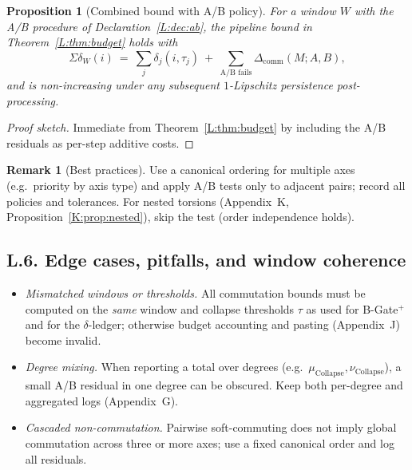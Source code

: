 \documentclass[11pt]{article}
\DeclareRobustCommand{\hyp}{\nobreakdash-}
\numberwithin{equation}{section}
\newtheorem{proposition}[theorem]{Proposition}
\theoremstyle{definition}
\newtheorem{remark}[theorem]{Remark}
\DeclareRobustCommand{\muc}{\mu_{\mathrm{Collapse}}}
\DeclareRobustCommand{\nuc}{\nu_{\mathrm{Collapse}}}
\begin{document}
\begin{proposition}[Combined bound with A/B policy]\label{L:prop:combined}
For a window \(W\) with the A/B procedure of Declaration~\ref{L:dec:ab}, the pipeline bound in Theorem~\ref{L:thm:budget} holds with
\[
\Sigma\delta_W(i)\ =\ \sum_{j}\delta_j(i,\tau_j)\ +\ \sum_{\text{A/B fails}} \Delta_{\mathrm{comm}}(M;A,B),
\]
and is non\hyp increasing under any subsequent \(1\)\hyp Lipschitz persistence post\hyp processing.
\end{proposition}

\begin{proof}[Proof sketch]
Immediate from Theorem~\ref{L:thm:budget} by including the A/B residuals as per\hyp step additive costs.
\end{proof}

\begin{remark}[Best practices]
Use a canonical ordering for multiple axes (e.g.\ priority by axis type) and apply A/B tests only to adjacent pairs; record all policies and tolerances. For nested torsions (Appendix~K, Proposition~\ref{K:prop:nested}), skip the test (order independence holds).
\end{remark}

\subsection*{L.6. Edge cases, pitfalls, and window coherence}
\begin{itemize}\itemsep0.25em
  \item \emph{Mismatched windows or thresholds.} All commutation bounds must be computed on the \emph{same} window and collapse thresholds \(\tau\) as used for B-Gate\(^{+}\) and for the \(\delta\)\hyp ledger; otherwise budget accounting and pasting (Appendix~J) become invalid.
  \item \emph{Degree mixing.} When reporting a total over degrees (e.g.\ \(\muc,\nuc\)), a small A/B residual in one degree can be obscured. Keep both per\hyp degree and aggregated logs (Appendix~G).
  \item \emph{Cascaded non\hyp commutation.} Pairwise soft\hyp commuting does not imply global commutation across three or more axes; use a fixed canonical order and log all residuals.
\end{itemize}
\end{document}
